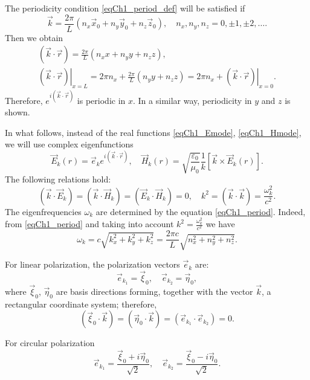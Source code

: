 The periodicity condition \eqref{eqCh1_period_def} will be satisfied if 
\begin{equation}
\vec{k} = \frac{2 \pi}{L}\left(n_x \vec{x}_0
+ n_y \vec{y}_0
+ n_z \vec{z}_0
\right),
\quad
n_x, n_y, n_z = 0, \pm 1, \pm 2, \dots .
\label{eqCh1_period}
\end{equation}
Then we obtain
\begin{eqnarray}
\left(\vec{k}\cdot\vec{r}\right) = \frac{2 \pi}{L}\left(n_x x
+ n_y y
+ n_z z
\right),
\nonumber \\
\left.\left(\vec{k}\cdot\vec{r}\right)\right|_{x = L} = 2 \pi n_x + \frac{2 \pi}{L}\left(n_y y
+ n_z z
\right) = 
2 \pi n_x + \left.\left(\vec{k}\cdot\vec{r}\right)\right|_{x = 0}.
\end{eqnarray}
Therefore,    
$e^{i\left(\vec{k}\cdot\vec{r}\right)}$
is periodic in $x$. In a similar way, periodicity in $y$ and $z$ is shown.
 
In what follows, instead of the real functions \eqref{eqCh1_Emode}, 
\eqref{eqCh1_Hmode}, we will use
complex eigenfunctions 
\begin{equation}
\vec{E}_k\left(r\right) = \vec{e}_k e^{i \left( \vec{k}\cdot\vec{r}\right)},
\quad
\vec{H}_k\left(r\right) = \sqrt{\frac{\varepsilon_0}{\mu_0}}\frac{1}{k}
\left[\vec{k} \times \vec{E}_k\left(r\right)\right].
\label{eqCh1_EHmode}
\end{equation}
The following relations hold:
\[
\left(\vec{k}\cdot\vec{E}_k\right) = 
\left(\vec{k}\cdot\vec{H}_k\right) = 
\left(\vec{E}_k \cdot \vec{H}_k\right) = 0,
\quad
k^2 = \left(\vec{k}\cdot\vec{k}\right) = 
\frac{\omega_k^2}{c^2}.
\]
The eigenfrequencies $\omega_k$ are determined by the equation
\eqref{eqCh1_period}. Indeed, from \eqref{eqCh1_period} and taking into account
$k^2 = \frac{\omega_k^2}{c^2}$ we have 
\begin{equation}
\omega_k = c \sqrt{k_x^2 + k_y^2 + k_z^2} = 
\frac{2 \pi c}{L} \sqrt{n_x^2 + n_y^2 + n_z^2}.
\end{equation}

For linear polarization, the polarization vectors $\vec{e}_k$ are:
\[
\vec{e}_{k_1} = \vec{\xi}_0,
\quad
\vec{e}_{k_2} = \vec{\eta}_0,
\]
where $\vec{\xi}_0$, $\vec{\eta}_0$ are basis directions forming, together with
the vector $\vec{k}$, a rectangular coordinate system; therefore, 
\[
\left(\vec{\xi}_0 \cdot \vec{k}\right) =
\left(\vec{\eta}_0 \cdot \vec{k}\right) =
\left(\vec{e}_{k_1} \cdot \vec{e}_{k_2}\right) = 0.
\]

For circular polarization
\[
\vec{e}_{k_1} = \frac{\vec{\xi}_0 + i \vec{\eta}_0}{\sqrt{2}},
\quad
\vec{e}_{k_2} = \frac{\vec{\xi}_0 - i \vec{\eta}_0}{\sqrt{2}}.
\]

